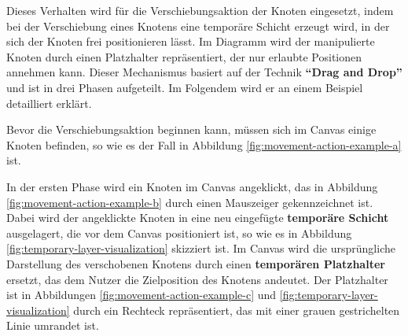 Dieses Verhalten wird für die Verschiebungsaktion der Knoten eingesetzt, indem bei der Verschiebung eines Knotens eine temporäre Schicht erzeugt wird, in der sich der Knoten frei positionieren lässt. Im Diagramm wird der manipulierte Knoten durch einen Platzhalter repräsentiert, der nur erlaubte Positionen annehmen kann. Dieser Mechanismus basiert auf der Technik \textbf{\enquote{Drag and Drop}} und ist in drei Phasen aufgeteilt. Im Folgendem wird er an einem Beispiel detailliert erklärt.

Bevor die Verschiebungsaktion beginnen kann, müssen sich im Canvas einige Knoten befinden, so wie es der Fall in Abbildung \ref{fig:movement-action-example-a} ist.

In der ersten Phase wird ein Knoten im Canvas angeklickt, das in Abbildung \ref{fig:movement-action-example-b} durch einen Mauszeiger gekennzeichnet ist. Dabei wird der angeklickte Knoten in eine neu eingefügte \textbf{temporäre Schicht} ausgelagert, die vor dem Canvas positioniert ist, so wie es in Abbildung \ref{fig:temporary-layer-visualization} skizziert ist. Im Canvas wird die ursprüngliche Darstellung des verschobenen Knotens durch einen \textbf{temporären Platzhalter} ersetzt, das dem Nutzer die Zielposition des Knotens andeutet. Der Platzhalter ist in Abbildungen \ref{fig:movement-action-example-c} und \ref{fig:temporary-layer-visualization} durch ein Rechteck repräsentiert, das mit einer grauen gestrichelten Linie umrandet ist.

